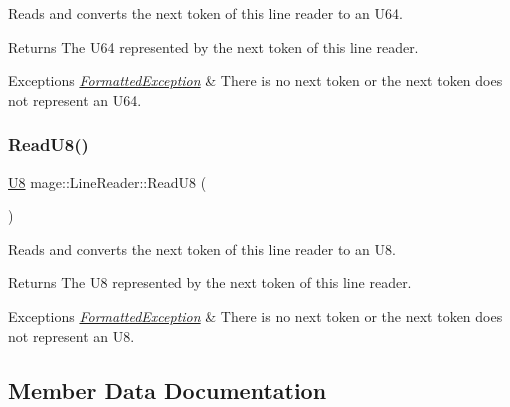 Reads and converts the next token of this line reader to an {\ttfamily U64}.

\begin{DoxyReturn}{Returns}
The {\ttfamily U64} represented by the next token of this line reader. 
\end{DoxyReturn}

\begin{DoxyExceptions}{Exceptions}
{\em \hyperlink{structmage_1_1_formatted_exception}{Formatted\+Exception}} & There is no next token or the next token does not represent an {\ttfamily U64}. \\
\hline
\end{DoxyExceptions}
\hypertarget{classmage_1_1_line_reader_a5fcc116b81d0357acdb9641e8f293e31}{}\label{classmage_1_1_line_reader_a5fcc116b81d0357acdb9641e8f293e31} 
\subsubsection{\texorpdfstring{Read\+U8()}{ReadU8()}}
{\footnotesize\ttfamily \hyperlink{namespacemage_afc638980bc6154f15af5e2d93a0e0ea9}{U8} mage\+::\+Line\+Reader\+::\+Read\+U8 (\begin{DoxyParamCaption}{ }\end{DoxyParamCaption})\hspace{0.3cm}{\ttfamily [protected]}}

Reads and converts the next token of this line reader to an {\ttfamily U8}.

\begin{DoxyReturn}{Returns}
The {\ttfamily U8} represented by the next token of this line reader. 
\end{DoxyReturn}

\begin{DoxyExceptions}{Exceptions}
{\em \hyperlink{structmage_1_1_formatted_exception}{Formatted\+Exception}} & There is no next token or the next token does not represent an {\ttfamily U8}. \\
\hline
\end{DoxyExceptions}


\subsection{Member Data Documentation}
\hypertarget{classmage_1_1_line_reader_a2f1cfe313dc89741386178e63a6b8b0c}{}\label{classmage_1_1_line_reader_a2f1cfe313dc89741386178e63a6b8b0c} 
